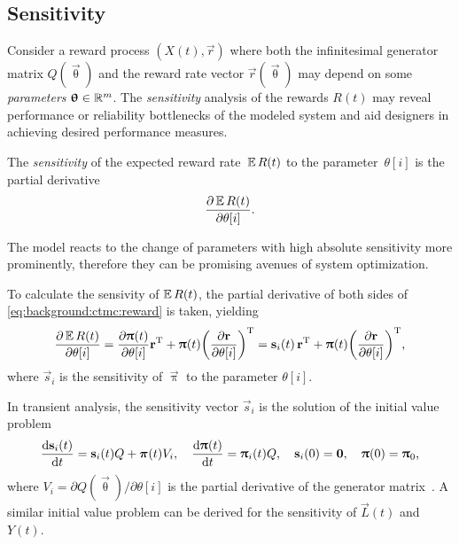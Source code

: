 \subsection{Sensitivity}

Consider a reward process $(X(t), \vec{r})$ where both the
infinitesimal generator matrix $Q(\vec{\uptheta})$ and the reward rate
vector $\vec{r}(\vec{\uptheta})$ may depend on some \emph{parameters}
$\bm{\mathrm{\uptheta}} \in \mathbb{R}^m$. The \emph{sensitivity} analysis of the
rewards $R(t)$ may reveal performance or reliability bottlenecks of
the modeled system and aid designers in achieving desired performance
measures.

\begin{dfn}
  The \emph{sensitivity} of the expected reward rate~$\operatorname{\mathbb{E}} R(t)$ to the
  parameter~$\theta[i]$ is the partial derivative
  \begin{equation}
    \frac{\partial \operatorname{\mathbb{E}} R(t)}{\partial \theta[i]} \text.
  \end{equation}
\end{dfn}

The model reacts to the change of parameters with high absolute
sensitivity more prominently, therefore they can be promising avenues
of system optimization.

To calculate the sensivity of $\operatorname{\mathbb{E}} R(t)$, the partial derivative of
both sides of \cref{eq:background:ctmc:reward} is taken, yielding
\begin{equation}
  \label{eq:background:ctmc:sensitivity:productrule}
  \frac{\partial \Ex R(t)}{\partial \theta[i]} = \frac{\partial
    \vec{\uppi}(t)}{\partial \theta[i]} \vec{r}^\T + \vec{\uppi}(t)
  \mleft(\frac{\partial \vec{r}}{\partial \theta[i]}\mright)^\T =
  \vec{s}_i(t) \, \vec{r}^\T + \vec{\uppi}(t)
  \mleft(\frac{\partial \vec{r}}{\partial \theta[i]}\mright)^\T \text,
\end{equation}
where $\vec{s}_i$ is the sensitivity of $\vec{\uppi}$ to the parameter
$\theta[i]$.

In transient analysis, the sensitivity vector $\vec{s}_i$ is the
solution of the initial value problem
\begin{equation}
  \frac{\mathrm{d} \bm{\mathrm{s}}_i(t)}{\mathrm{d} t} = \bm{\mathrm{s}}_i(t) Q + \bm{\mathrm{\pi}}(t) V_i,
  \quad \frac{\mathrm{d} \bm{\mathrm{\uppi}}(t)}{\mathrm{d} t} = \bm{\mathrm{\uppi}}_i(t) Q,
  \quad \bm{\mathrm{s}}_i(0) = \bm{\mathrm{0}}, \quad \bm{\mathrm{\uppi}}(0) = \bm{\mathrm{\uppi}}_0
  \text,
\end{equation}
where $V_i = \partial Q(\vec{\uptheta}) / \partial \theta[i]$ is the
partial derivative of the generator
matrix~\citep{DBLP:conf/sigmetrics/RameshT93}. A similar initial value
problem can be derived for the sensitivity of $\vec{L}(t)$ and $Y(t)$.

